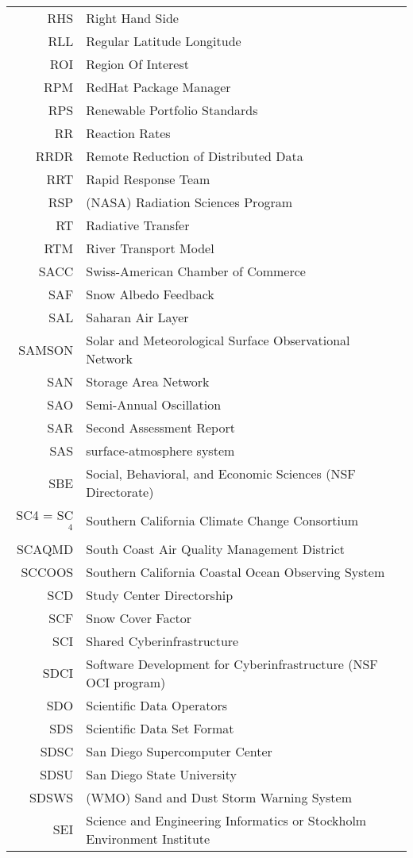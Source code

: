 \documentclass[12pt,twoside]{article}
\begin{document}
\begin{longtable}[>{\bfseries}l]{>{\ttfamily}r l}
RHS & Right Hand Side \\
RLL & Regular Latitude Longitude \\
ROI & Region Of Interest \\
RPM & RedHat Package Manager \\
RPS & Renewable Portfolio Standards \\
RR & Reaction Rates \\
RRDR & Remote Reduction of Distributed Data \\
RRT & Rapid Response Team \\
RSP & (NASA) Radiation Sciences Program \\
RT & Radiative Transfer \\
RTM & River Transport Model \\
SACC & Swiss-American Chamber of Commerce \\
SAF & Snow Albedo Feedback \\
SAL & Saharan Air Layer \\
SAMSON & Solar and Meteorological Surface Observational Network \\
SAN & Storage Area Network \\
SAO & Semi-Annual Oscillation \\
SAR & Second Assessment Report \\
SAS & surface-atmosphere system \\
SBE & Social, Behavioral, and Economic Sciences (NSF Directorate) \\
SC4 = SC$^{4}$ & Southern California Climate Change Consortium \\
SCAQMD & South Coast Air Quality Management District \\
SCCOOS & Southern California Coastal Ocean Observing System \\
SCD & Study Center Directorship \\
SCF & Snow Cover Factor \\
SCI & Shared Cyberinfrastructure \\
SDCI & Software Development for Cyberinfrastructure (NSF OCI program) \\
SDO & Scientific Data Operators \\
SDS & Scientific Data Set Format \\
SDSC & San Diego Supercomputer Center \\
SDSU & San Diego State University \\
SDSWS & (WMO) Sand and Dust Storm Warning System \\
SEI & Science and Engineering Informatics or Stockholm Environment Institute \\

\end{longtable}
\end{document}
